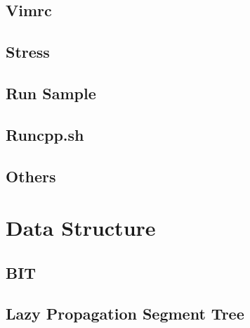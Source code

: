 \documentclass[a4paper,10pt,twocolumn,oneside,x11names]{article}
\begin{document}
\subsection{Vimrc}



\subsection{Stress}


\subsection{Run Sample}


\subsection{Runcpp.sh}


\subsection{Others}


%

%

\section{Data Structure}

\subsection{BIT}


\subsection{Lazy Propagation Segment Tree}

\end{document}
